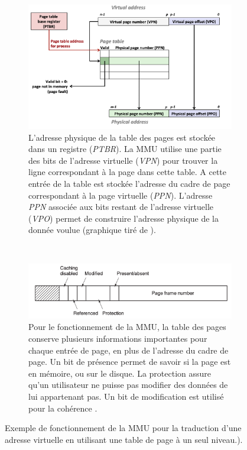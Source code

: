 \begin{figure}
    \centering
    \begin{subfigure}[b]{\linewidth}\centering
        \includegraphics[width=0.7\linewidth]{images/memory_page_table_nbits.png}
        \caption{L'adresse physique de la table des pages est stockée dans un registre (\textit{PTBR}). La MMU utilise une partie des bits de l'adresse virtuelle (\textit{VPN}) pour trouver la ligne correspondant à la page dans cette table. A cette entrée de la table est stockée l'adresse du cadre de page correspondant à la page virtuelle (\textit{PPN}). L'adresse \textit{PPN} associée aux bits restant de l'adresse virtuelle (\textit{VPO}) permet de construire l'adresse physique de la donnée voulue (graphique tiré de \cite{Mowry2012}).}
        \label{pic:memory_page_table_nbits}
    \end{subfigure}
    ~ %
    \begin{subfigure}[b]{\linewidth}\centering
        \includegraphics[width=0.7\linewidth]{images/memory_page_table_entry.png}
        \caption{Pour le fonctionnement de la MMU, la table des pages conserve plusieurs informations importantes pour chaque entrée de page, en plus de l'adresse du cadre de page. Un bit de présence permet de savoir si la page est en mémoire, ou sur le disque. La protection assure qu'un utilisateur ne puisse pas modifier des données de lui appartenant pas. Un bit de modification est utilisé pour la cohérence \cite{tanenbaum2008systeme}.}
        \label{pic:memory_page_table_entry}
    \end{subfigure}
    

    \caption{Exemple de fonctionnement de la MMU pour la traduction d'une adresse virtuelle en utilisant une table de page à un seul niveau.). }\label{fig:memory_page_table_un_niveau}
\end{figure}


